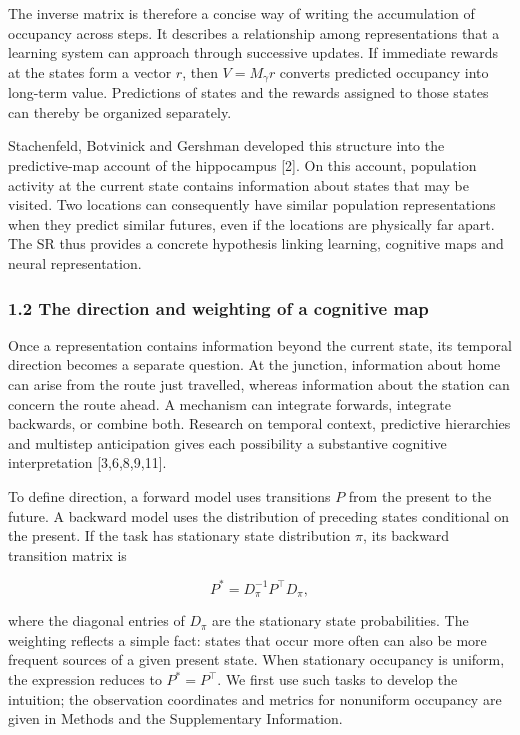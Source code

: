 \documentclass[11pt,a4paper]{article}
\begin{document}
The inverse matrix is therefore a concise way of writing the
accumulation of occupancy across steps. It describes a relationship
among representations that a learning system can approach through
successive updates. If immediate rewards at the states form a vector
\(r\), then \(V=M_\gamma r\) converts predicted occupancy into long-term
value. Predictions of states and the rewards assigned to those states
can thereby be organized separately.

Stachenfeld, Botvinick and Gershman developed this structure into the
predictive-map account of the hippocampus {[}2{]}. On this account,
population activity at the current state contains information about
states that may be visited. Two locations can consequently have similar
population representations when they predict similar futures, even if
the locations are physically far apart. The SR thus provides a concrete
hypothesis linking learning, cognitive maps and neural representation.

\subsubsection{1.2 The direction and weighting of a cognitive
map}\label{the-direction-and-weighting-of-a-cognitive-map}

Once a representation contains information beyond the current state, its
temporal direction becomes a separate question. At the junction,
information about home can arise from the route just travelled, whereas
information about the station can concern the route ahead. A mechanism
can integrate forwards, integrate backwards, or combine both. Research
on temporal context, predictive hierarchies and multistep anticipation
gives each possibility a substantive cognitive interpretation
{[}3,6,8,9,11{]}.

\par
\noindent\begin{minipage}{\linewidth}

To define direction, a forward model uses transitions \(P\) from the
present to the future. A backward model uses the distribution of
preceding states conditional on the present. If the task has stationary
state distribution \(\pi\), its backward transition matrix is

\[
P^*=D_\pi^{-1}P^\top D_\pi,
\]

\end{minipage}\par

where the diagonal entries of \(D_\pi\) are the stationary state
probabilities. The weighting reflects a simple fact: states that occur
more often can also be more frequent sources of a given present state.
When stationary occupancy is uniform, the expression reduces to
\(P^*=P^\top\). We first use such tasks to develop the intuition; the
observation coordinates and metrics for nonuniform occupancy are given
in Methods and the Supplementary Information.
\end{document}
